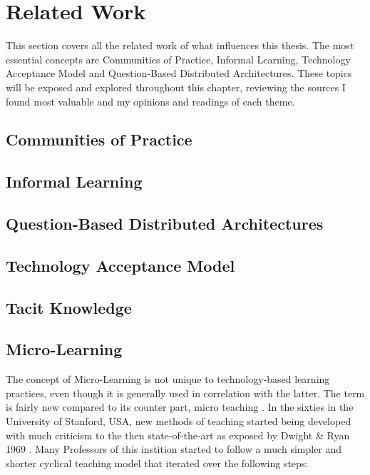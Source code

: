 \chapter{Related Work}
\label{cha:relatedwork}

This section covers all the related work of what influences this thesis.
The most essential concepts are Communities of Practice, Informal Learning, 
Technology Acceptance Model 
and Question-Based Distributed Architectures.
These topics will be exposed and explored throughout this chapter, 
reviewing the sources I found most valuable and my opinions and 
readings of each theme.


\section{Communities of Practice}
\section{Informal Learning}
\section{Question-Based Distributed Architectures}
\section{Technology Acceptance Model}

\section{Tacit Knowledge}

\section{Micro-Learning}

The concept of Micro-Learning is not unique to technology-based learning practices,
even though it is generally used in correlation with the latter. The term is fairly
new compared to its counter part, micro teaching \cite{microlearningdimensions}. 
In the sixties in the University of Stanford, USA, new methods of teaching started 
being developed with much criticism to the then state-of-the-art as exposed by 
Dwight \& Ryan 1969 \cite{dwight_ryan_1969}. Many Professors of this instition started
to follow a much simpler and shorter cyclical teaching model that iterated over
the following steps:

